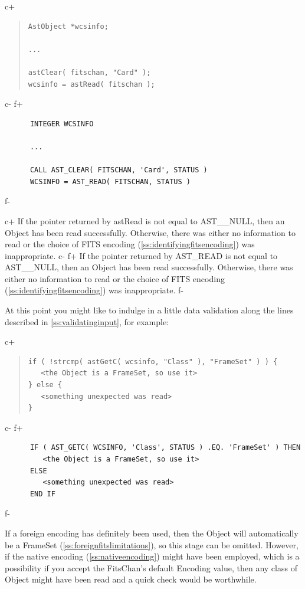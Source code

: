 \documentclass[twoside,11pt]{article}
\newcommand{\secref}[1]{\S\ref{#1}}
\renewcommand{\secref}[1]{\ref{#1}}
\begin{document}
c+
\begin{quote}
\small
\begin{verbatim}
AstObject *wcsinfo;

...

astClear( fitschan, "Card" );
wcsinfo = astRead( fitschan );
\end{verbatim}
\normalsize
\end{quote}
c-
f+
\small
\begin{verbatim}
      INTEGER WCSINFO

      ...

      CALL AST_CLEAR( FITSCHAN, 'Card', STATUS )
      WCSINFO = AST_READ( FITSCHAN, STATUS )
\end{verbatim}
\normalsize
f-

c+
If the pointer returned by astRead is not equal to AST\_\_NULL, then
an Object has been read successfully. Otherwise, there was either no
information to read or the choice of FITS encoding
(\secref{ss:identifyingfitsencoding}) was inappropriate.
c-
f+
If the pointer returned by AST\_READ is not equal to AST\_\_NULL, then
an Object has been read successfully. Otherwise, there was either no
information to read or the choice of FITS encoding
(\secref{ss:identifyingfitsencoding}) was inappropriate.
f-

At this point you might like to indulge in a little data validation
along the lines described in \secref{ss:validatinginput}, for example:

c+
\begin{quote}
\small
\begin{verbatim}
if ( !strcmp( astGetC( wcsinfo, "Class" ), "FrameSet" ) ) {
   <the Object is a FrameSet, so use it>
} else {
   <something unexpected was read>
}
\end{verbatim}
\normalsize
\end{quote}
c-
f+
\small
\begin{verbatim}
      IF ( AST_GETC( WCSINFO, 'Class', STATUS ) .EQ. 'FrameSet' ) THEN
         <the Object is a FrameSet, so use it>
      ELSE
         <something unexpected was read>
      END IF
\end{verbatim}
\normalsize
f-

If a foreign encoding has definitely been used, then the Object will
automatically be a FrameSet (\secref{ss:foreignfitslimitations}), so
this stage can be omitted. However, if the native encoding
(\secref{ss:nativeencoding}) might have been employed, which is a
possibility if you accept the FitsChan's default Encoding value, then
any class of Object might have been read and a quick check would be
worthwhile.
\end{document}
